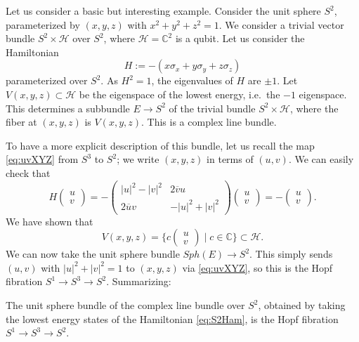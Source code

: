 \documentclass[12pt]{article}
\numberwithin{equation}{section}
\numberwithin{figure}{section}
\theoremstyle{remark}
\def\bC{\mathbb{C}}
\def\cH{\mathcal{H}}
\let\bar\overline
\begin{document}
Let us consider a basic but interesting example.
Consider the unit sphere $S^2$, parameterized by $(x,y,z)$ with $x^2+y^2+z^2=1$.
We consider a trivial vector bundle $S^2\times \cH$ over $S^2$,
where $\cH=\bC^2$ is a qubit.
Let us consider the Hamiltonian \begin{equation}
  H := -(x\sigma_x +y \sigma_y + z\sigma_z)
  \label{eq:S2Ham}
\end{equation} parameterized over $S^2$.
As $H^2=1$, the eigenvalues of $H$ are $\pm 1$.
Let $V(x,y,z) \subset \cH$ be the eigenspace of the lowest energy, i.e.~the $-1$ eigenspace.
This determines a subbundle $E \to S^2 $ of the trivial bundle $S^2\times \cH$,
where the fiber at $(x,y,z)$ is $V(x,y,z)$.
This is a complex line bundle.

To have a more explicit description of this bundle,
let us recall the map \eqref{eq:uvXYZ} from $S^3$ to $S^2$;
we write $(x,y,z)$ in terms of $(u,v)$.
We can easily check that 
\begin{equation}
H \begin{pmatrix}
u\\ v
\end{pmatrix}
=
- \begin{pmatrix}
|u|^2-|v|^2 & 2\bar v u \\
2 \bar u v & -|u|^2+|v|^2
\end{pmatrix}
\begin{pmatrix}
  u\\ v
  \end{pmatrix}
=
-\begin{pmatrix}
  u\\ v
\end{pmatrix}.
\end{equation}
We have shown that 
\begin{equation}
  V(x,y,z)= \{ c\begin{pmatrix}
    u\\ v
  \end{pmatrix}  \mid c\in \bC \} \subset \cH.
\end{equation} 
We can now take the unit sphere bundle $Sph(E)\to S^2$.
This simply sends $(u,v)$ with $|u|^2+|v|^2=1$ to $(x,y,z)$ via \eqref{eq:uvXYZ},
so this is the Hopf fibration $S^1\to S^3\to S^2$.
Summarizing:
\begin{example}
  \label{ex:S2parameterized}
  The unit sphere bundle 
  of the complex line bundle over $S^2$,
  obtained by taking the lowest energy states 
  of the Hamiltonian \eqref{eq:S2Ham},
  is the Hopf fibration $S^1\to S^3\to S^2$.
\end{example}
\end{document}
